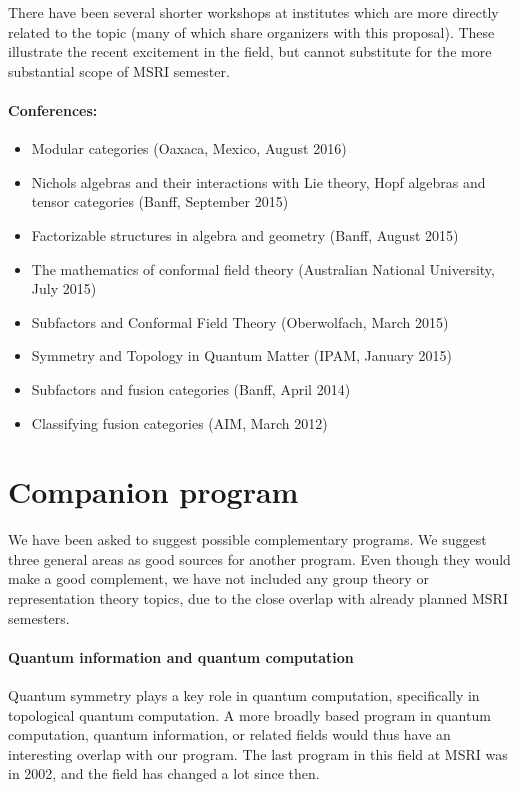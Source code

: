\documentclass[12pt]{article}
\begin{document}
There have been several shorter workshops at institutes which are more directly related to the topic (many of which share organizers with this proposal).  These illustrate the recent excitement in the field, but cannot substitute for the more substantial scope of MSRI semester.

\paragraph{Conferences:}
\begin{itemize}
  \setlength{\itemsep}{1pt}
  \setlength{\parskip}{0pt}
  \setlength{\parsep}{0pt}
\item Modular categories (Oaxaca, Mexico, August 2016)
\item Nichols algebras and their interactions with Lie theory, Hopf algebras and tensor categories (Banff, September 2015)
\item Factorizable structures in algebra and geometry (Banff, August 2015)
\item The mathematics of conformal field theory (Australian National University, July 2015)
\item Subfactors and Conformal Field Theory (Oberwolfach, March 2015)
\item Symmetry and Topology in Quantum Matter (IPAM, January 2015)
\item Subfactors and fusion categories (Banff, April 2014)
\item Classifying fusion categories (AIM, March 2012)
\end{itemize}

\section{Companion program}
We have been asked to suggest possible complementary programs. We suggest three general areas as good sources for another program. Even though they would make a good complement, we have not included any group theory or representation theory topics, due to the close overlap with already planned MSRI semesters.

\paragraph{Quantum information and quantum computation}
Quantum symmetry plays a key role in quantum computation, specifically in topological quantum computation.  A more broadly based program in quantum computation, quantum information, or related fields would thus have an interesting overlap with our program.  The last program in this field at MSRI was in 2002, and the field has changed a lot since then.
\end{document}
